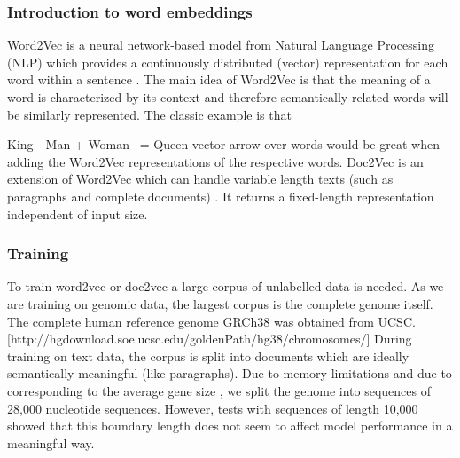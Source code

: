 \subsubsection{Introduction to word embeddings}
Word2Vec is a neural network-based model from Natural Language Processing (NLP) which provides a continuously distributed (vector) representation for each word within a sentence \cite{w2v1}\cite{w2v2}. The main idea of Word2Vec is that the meaning of a word is characterized by its context and therefore semantically related words will be similarly represented. The classic example is that


King - Man + Woman ~= Queen
vector arrow over words would be great
when adding the Word2Vec representations of the respective words.
Doc2Vec is an extension of Word2Vec which can handle variable length texts (such as paragraphs and complete documents) \cite{d2v1} \cite{d2v2}. It returns a fixed-length representation independent of input size.

\subsubsection{Training}
To train word2vec or doc2vec a large corpus of unlabelled data is needed. As we are training on genomic data, the largest corpus is the complete genome itself. The complete human reference genome GRCh38 was obtained from UCSC. [http://hgdownload.soe.ucsc.edu/goldenPath/hg38/chromosomes/]
During training on text data, the corpus is split into documents which are ideally semantically meaningful (like paragraphs). Due to memory limitations and due to corresponding to the average gene size \cite{bionumbers}, we split the genome into sequences of 28,000 nucleotide sequences. However, tests with sequences of length 10,000 showed that this boundary length does not seem to affect model performance in a meaningful way.
